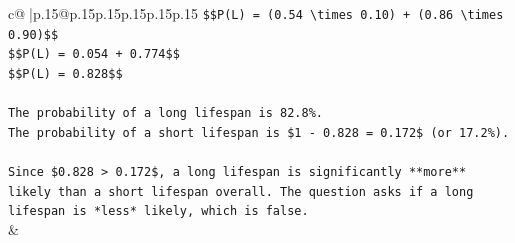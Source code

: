 \documentclass{article}
\begin{document}
{\begin{supertabular}{c@{$\;$}|p{.15\linewidth}@{}p{.15\linewidth}p{.15\linewidth}p{.15\linewidth}p{.15\linewidth}p{.15\linewidth}}
{{{\texttt{\$\$P(L) = (0.54 \textbackslash{}times 0.10) + (0.86 \textbackslash{}times 0.90)\$\$} \\
\texttt{\$\$P(L) = 0.054 + 0.774\$\$} \\
\texttt{\$\$P(L) = 0.828\$\$} \\
\\ 
\texttt{The probability of a long lifespan is 82.8\%.} \\
\texttt{The probability of a short lifespan is \$1 {-} 0.828 = 0.172\$ (or 17.2\%).} \\
\\ 
\texttt{Since \$0.828 > 0.172\$, a long lifespan is significantly **more** likely than a short lifespan overall. The question asks if a long lifespan is *less* likely, which is false.} \\
            }
        }
    }
    & \\ \\


\end{supertabular}}
\end{document}
